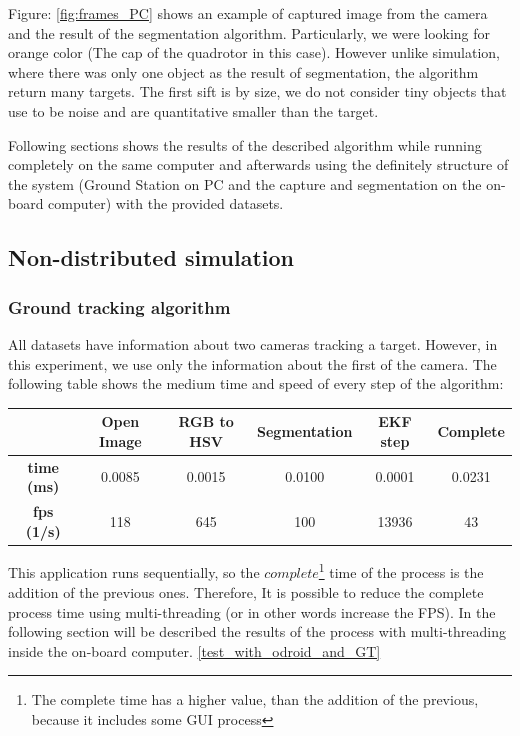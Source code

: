 	Figure: \ref{fig:frames_PC} shows an example of captured image from the camera and the result of the segmentation algorithm. Particularly, we were looking for orange color (The cap of the quadrotor in this case). However unlike simulation, where there was only one object as the result of segmentation, the algorithm return many targets. The first sift is by size, we do not consider tiny objects that use to be noise and are quantitative smaller than the target.
		
	
	Following sections shows the results of the described algorithm while running completely on the same computer and afterwards using the definitely structure of the system (Ground Station on PC and the capture and segmentation on the on-board computer) with the provided datasets.

\subsection{Non-distributed simulation}
\subsubsection{Ground tracking algorithm}
	All datasets have information about two cameras tracking a target. However, in this experiment, we use only the information about the first  of the camera. The following table shows the medium time and speed of every step of the algorithm: \\
	
	{
	\centering
		\begin{tabular}{|c|c|c|c|c||c|}
		\hline  					&  Open Image	&  RGB to HSV 	& Segmentation 	& EKF step  & Complete \\ 
		\hline  \textbf{time (ms)}	& 0.0085 		& 0.0015 		& 0.0100 		& 0.0001 	& 0.0231 	\\ 
		\hline  \textbf{fps (1/s)}	&  118			&  645			&  100			& 13936 	& 43 		\\ 
		\hline 
		\end{tabular} 
	}
	\newline

	{
	\label{Reference_fps_table}
	This application runs sequentially, so the $complete$\footnote{The complete time has a higher value, than the addition of the previous, because it includes some GUI process} time of the process is the addition of the previous ones. Therefore, It is possible to reduce the complete process time using multi-threading (or in other words increase the FPS). In the following section will be described the results of the process with multi-threading inside the on-board computer. \ref{test_with_odroid_and_GT}
	}
	

